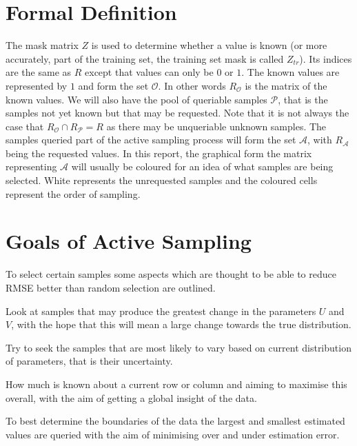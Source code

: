 \section{Formal Definition}
The mask matrix $Z$ is used to determine whether a value is known (or more accurately, part of the training set, the training set mask is called $Z_{tr}$). Its indices are the same as $R$ except that values can only be $0$ or $1$. The known values are represented by $1$ and form the set $\mathcal{O}$. In other words $R_\mathcal{O}$ is the matrix of the known values. We will also have the pool of queriable samples $\mathcal{P}$, that is the samples not yet known but that may be requested. Note that it is not always the case that $R_{\mathcal{O}} \cap R_{\mathcal{P}} = R$ as there may be unqueriable unknown samples. The samples queried part of the active sampling process will form the set $\mathcal{A}$, with $R_{\mathcal{A}}$ being the requested values. In this report, the graphical form the matrix representing $\mathcal{A}$ will usually be coloured for an idea of what samples are being selected. White represents the unrequested samples and the coloured cells represent the order of sampling.


\section{Goals of Active Sampling}
\label{sec:as_goals}
To select certain samples some aspects which are thought to be able to reduce RMSE better than random selection are outlined.

\begin{description}[style=standard,leftmargin=.7cm,font=\bfseries]
  \item[Model] Look at samples that may produce the greatest change in the parameters $U$ and $V$, with the hope that this will mean a large change towards the true distribution.
  \item[Sample Uncertainty] Try to seek the samples that are most likely to vary based on current distribution of parameters, that is their uncertainty.
  \item[Knowledge] How much is known about a current row or column and aiming to maximise this overall, with the aim of getting a global insight of the data.
  \item[Max-Minimum] To best determine the boundaries of the data the largest and smallest estimated values are queried with the aim of minimising over and under estimation error.
\end{description}


